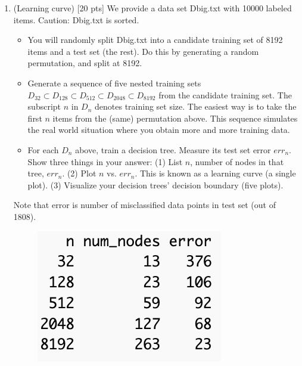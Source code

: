 \documentclass[a4paper]{article}
\theoremstyle{definition}
\newenvironment{soln}{
    \leavevmode\color{blue}\ignorespaces
}{}
\begin{document}
\begin{enumerate}
\pagebreak

\item (Learning curve)  [20 pts] We provide a data set Dbig.txt with 10000 labeled items.  Caution: Dbig.txt is sorted.
  \begin{itemize}
  
  \item You will randomly split Dbig.txt into a candidate training set of 8192 items and a test set (the rest).  Do this by generating a random permutation, and split at 8192.
  
  \item Generate a sequence of five nested training sets $D_{32} \subset D_{128} \subset D_{512} \subset D_{2048} \subset D_{8192}$ from the candidate training set.  The subscript $n$ in $D_n$ denotes training set size.  The easiest way is to take the first $n$ items from the (same) permutation above.  This sequence simulates the real world situation where you obtain more and more training data.
  
  \item For each $D_n$ above, train a decision tree.  Measure its test set error $err_n$.  Show three things in your answer: (1) List $n$, number of nodes in that tree, $err_n$. (2) Plot $n$ vs. $err_n$.  This is known as a learning curve (a single plot). (3) Visualize your decision trees' decision boundary (five plots). \\
  \end{itemize}

\begin{soln}
  Note that error is number of misclassified data points in test set (out of 1808).
\end{soln}

  \begin{figure}[htbp]
    \centerline{\includegraphics[scale=1]{Q7a.png}}
  \end{figure}


\end{enumerate}
\end{document}
